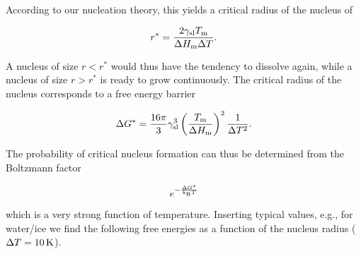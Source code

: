 \documentclass[letterpaper,10pt,english]{sphinxmanual}
\begin{document}
\sphinxAtStartPar
According to our nucleation theory, this yields a critical radius of the nucleus of

\sphinxAtStartPar
\begin{equation}
r^{*}=\frac{2\gamma_{\rm sl}T_{\rm m}}{\Delta H_{\rm m}\Delta T}.
\end{equation}

\sphinxAtStartPar
A nucleus of size \(r<r^*\) would thus have the tendency to dissolve again, while a nucleus of size \(r>r^*\) is ready to grow continuously. The critical radius of the nucleus corresponds to a free energy barrier

\sphinxAtStartPar
\begin{equation}
\Delta G^{*}=\frac{16\pi}{3}\gamma_{\rm sl}^3\left (\frac{T_{\rm m}}{\Delta H_{\rm m}}\right )^2\frac{1}{\Delta T^2}.
\end{equation}

\sphinxAtStartPar
The probability of critical nucleus formation can thus be determined from the Boltzmann factor

\sphinxAtStartPar
\begin{equation}
e^{-\frac{\Delta G^{*}}{k_{\rm B}T}}
\end{equation}

\sphinxAtStartPar
which is a very strong function of temperature. Inserting typical values, e.g., for water/ice we find the following free energies as a function of the nucleus radius (\(\Delta T= 10\, {\rm K}\)).
\end{document}
